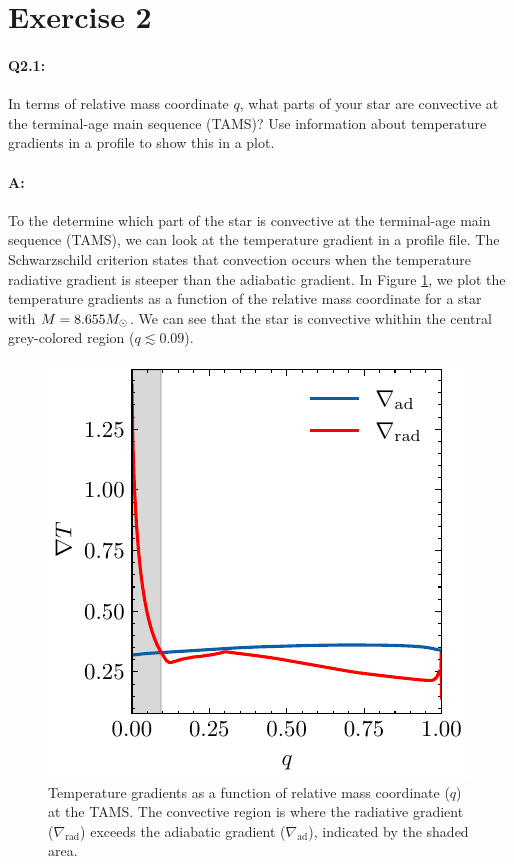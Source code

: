 \documentclass[twocolumn,fontsize=11pt]{scrartcl}
\begin{document}
\section{Exercise 2}

\paragraph{Q2.1:} In terms of relative mass coordinate \(q\), what parts of your star are convective at the terminal-age main sequence (TAMS)? Use information about temperature gradients in
a profile to show this in a plot.

\paragraph{A:} To the determine which part of the star is convective at the terminal-age main sequence (TAMS), we can look at the temperature gradient in a profile file. The Schwarzschild criterion states that convection occurs when the temperature radiative gradient is steeper than the adiabatic gradient. In Figure \ref{fig:q21_convective_regions}, we plot the temperature gradients as a function of the relative mass coordinate for a star with \(M = 8.655M_\odot\). We can see that the star is convective whithin the central grey-colored region (\(q \lesssim 0.09\)).

\begin{figure}[htbp]
    \centering
    \includegraphics{q21_grad.pdf}
    \caption{Temperature gradients as a function of relative mass coordinate (\(q\)) at the TAMS. The convective region is where the radiative gradient (\(\nabla_{\text{rad}}\)) exceeds the adiabatic gradient (\(\nabla_{\text{ad}}\)), indicated by the shaded area.}
    \label{fig:q21_convective_regions}
\end{figure}
\end{document}
